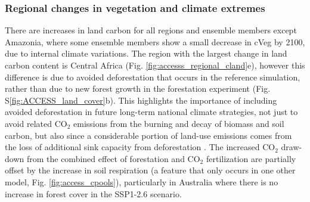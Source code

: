 \documentclass[]{article}
\begin{document}

\subsubsection{Regional changes in vegetation and climate extremes}

There are increases in land carbon for all regions and ensemble members except Amazonia, where some ensemble members show a small decrease in cVeg by 2100, due to internal climate variations.
The region with the largest change in land carbon content is Central Africa (Fig. \ref{fig:accesss_regional_cland}e), however this difference is due to avoided deforestation that occurs in the reference simulation, rather than due to new forest growth in the forestation experiment (Fig. S\ref{fig:ACCESS_land_cover}b).
This highlights the importance of including avoided deforestation in future long-term national climate strategies, not just to avoid related CO$_2$ emissions from the burning and decay of biomass and soil carbon, but also since a considerable portion of land-use emissions comes from the loss of additional sink capacity from deforestation \parencite{gitz_amplifying_2003, pongratz_terminology_2014, obermeier_modelled_2021}.
The increased CO$_2$ draw-down from the combined effect of forestation and CO$_2$ fertilization are partially offset by the increase in soil respiration (a feature that only occurs in one other model, Fig. \ref{fig:access_cpools}), particularly in Australia where there is no increase in forest cover in the SSP1-2.6 scenario.
\end{document}
